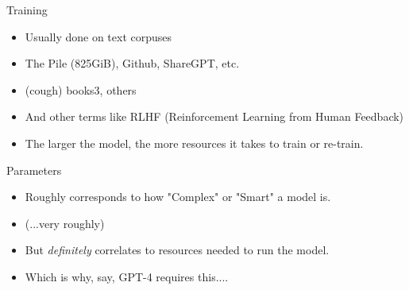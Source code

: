 \documentclass{beamer}
\begin{document}
\begin{frame}{Training}
	\begin{itemize}
		\item Usually done on text corpuses
		\pause
		\item The Pile (825GiB), Github, ShareGPT, etc.
		\pause
		\item (cough) books3, others
		\pause
		\item And other terms like RLHF (Reinforcement Learning from Human Feedback)
		\pause
		\item The larger the model, the more resources it takes to train or re-train.
	\end{itemize}
\end{frame}

\begin{frame}{Parameters}
	\begin{itemize}
		\item Roughly corresponds to how "Complex" or "Smart" a model is.
		\pause
		\item (...very roughly)
		\pause 
		\item But \textit{definitely} correlates to resources needed to run the model.
		\pause
		\item Which is why, say, GPT-4 requires this....
	\end{itemize}
\end{frame}



\begin{frame}[plain]
\end{frame}
\end{document}
